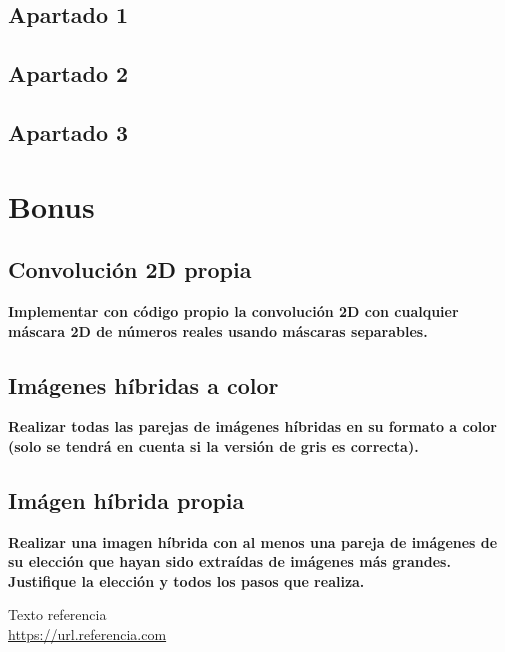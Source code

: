 \documentclass[11pt,a4paper]{article}
\begin{document}
\subsection{Apartado 1}

\subsection{Apartado 2}

\subsection{Apartado 3}

\newpage

\section{Bonus}

\subsection{Convolución 2D propia}

\noindent \textbf{Implementar con código propio la convolución 2D con cualquier máscara 2D de números reales usando
máscaras separables.}

\subsection{Imágenes híbridas a color}

\noindent \textbf{Realizar todas las parejas de imágenes híbridas en su formato a color (solo se tendrá en cuenta
si la versión de gris es correcta).}

\subsection{Imágen híbrida propia}

\noindent \textbf{Realizar una imagen híbrida con al menos una pareja de imágenes de su elección que hayan
sido extraídas de imágenes más grandes. Justifique la elección y todos los pasos que realiza.}

\newpage

\begin{thebibliography}{5}

Texto referencia
\\\url{https://url.referencia.com}

\end{thebibliography}
\end{document}
